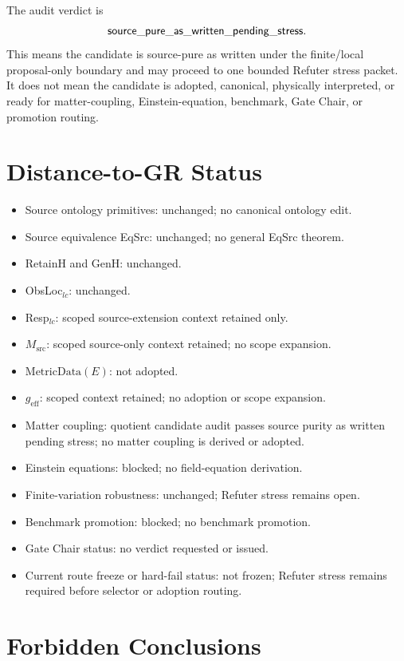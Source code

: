 The audit verdict is
\[
  \mathsf{source\_pure\_as\_written\_pending\_stress}.
\]
This means the candidate is source-pure as written under the finite/local
proposal-only boundary and may proceed to one bounded Refuter stress packet.
It does not mean the candidate is adopted, canonical, physically interpreted,
or ready for matter-coupling, Einstein-equation, benchmark, Gate Chair, or
promotion routing.

\section{Distance-to-GR Status}

\begin{itemize}
  \item Source ontology primitives: unchanged; no canonical ontology edit.
  \item Source equivalence EqSrc: unchanged; no general EqSrc theorem.
  \item RetainH and GenH: unchanged.
  \item ObsLoc\(_{lc}\): unchanged.
  \item Resp\(_{lc}\): scoped source-extension context retained only.
  \item \(M_{\mathrm{src}}\): scoped source-only context retained; no scope
    expansion.
  \item \(\mathrm{MetricData}(E)\): not adopted.
  \item \(g_{\mathrm{eff}}\): scoped context retained; no adoption or scope
    expansion.
  \item Matter coupling: quotient candidate audit passes source purity as
    written pending stress; no matter coupling is derived or adopted.
  \item Einstein equations: blocked; no field-equation derivation.
  \item Finite-variation robustness: unchanged; Refuter stress remains open.
  \item Benchmark promotion: blocked; no benchmark promotion.
  \item Gate Chair status: no verdict requested or issued.
  \item Current route freeze or hard-fail status: not frozen; Refuter stress
    remains required before selector or adoption routing.
\end{itemize}

\section{Forbidden Conclusions}

